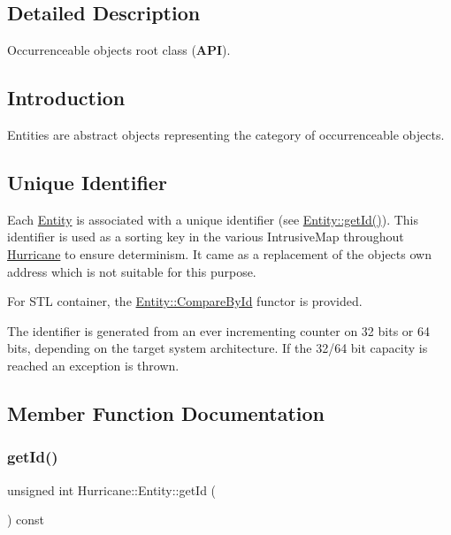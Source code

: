 \subsection{Detailed Description}
Occurrenceable objects root class ({\bfseries A\+PI}). 

\hypertarget{classHurricane_1_1Entity_secEntityIntro}{}\subsection{Introduction}\label{classHurricane_1_1Entity_secEntityIntro}
Entities are abstract objects representing the category of occurrenceable objects.\hypertarget{classHurricane_1_1Entity_secEntityId}{}\subsection{Unique Identifier}\label{classHurricane_1_1Entity_secEntityId}
Each \hyperlink{classHurricane_1_1Entity}{Entity} is associated with a unique identifier (see \hyperlink{classHurricane_1_1Entity_aaff727ad7411392d4a991a56e2579a60}{Entity\+::get\+Id()}). This identifier is used as a sorting key in the various Intrusive\+Map throughout \hyperlink{namespaceHurricane}{Hurricane} to ensure determinism. It came as a replacement of the object\textquotesingle{}s own address which is not suitable for this purpose.

For S\+TL container, the \hyperlink{structHurricane_1_1Entity_1_1CompareById}{Entity\+::\+Compare\+By\+Id} functor is provided.

The identifier is generated from an ever incrementing counter on 32 bits or 64 bits, depending on the target system architecture. If the 32/64 bit capacity is reached an exception is thrown. 

\subsection{Member Function Documentation}
\mbox{\label{classHurricane_1_1Entity_aaff727ad7411392d4a991a56e2579a60}} 
\subsubsection{\texorpdfstring{get\+Id()}{getId()}}
{\footnotesize\ttfamily unsigned int Hurricane\+::\+Entity\+::get\+Id (\begin{DoxyParamCaption}{ }\end{DoxyParamCaption}) const\hspace{0.3cm}{\ttfamily [inline]}}

